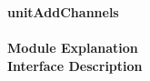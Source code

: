 \documentclass[../../../../doc/ASP-SoC_doc/main.tex]{subfiles}
\begin{document}
\textbf{unitAddChannels}
\\\\
\textbf{Module Explanation}
\\
\textbf{Interface Description}
\\
\end{document}
